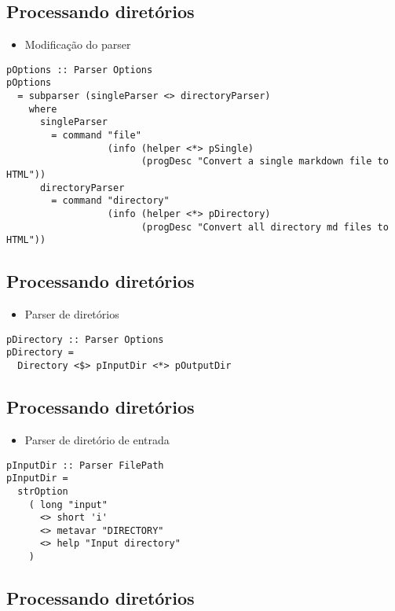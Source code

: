\documentclass[11pt]{article}
\begin{document}
\subsection*{Processando diretórios}
\label{sec:org5261a58}

\begin{itemize}
\item Modificação do parser
\end{itemize}

\begin{verbatim}
pOptions :: Parser Options
pOptions
  = subparser (singleParser <> directoryParser)
    where
      singleParser
        = command "file"
                  (info (helper <*> pSingle)
                        (progDesc "Convert a single markdown file to HTML"))
      directoryParser
        = command "directory"
                  (info (helper <*> pDirectory)
                        (progDesc "Convert all directory md files to HTML"))
\end{verbatim}
\subsection*{Processando diretórios}
\label{sec:org96790e4}

\begin{itemize}
\item Parser de diretórios
\end{itemize}

\begin{verbatim}
pDirectory :: Parser Options
pDirectory =
  Directory <$> pInputDir <*> pOutputDir
\end{verbatim}
\subsection*{Processando diretórios}
\label{sec:org1e0ca8f}

\begin{itemize}
\item Parser de diretório de entrada
\end{itemize}

\begin{verbatim}
pInputDir :: Parser FilePath
pInputDir =
  strOption
    ( long "input"
      <> short 'i'
      <> metavar "DIRECTORY"
      <> help "Input directory"
    )
\end{verbatim}
\subsection*{Processando diretórios}
\label{sec:org0973ba8}
\end{document}
